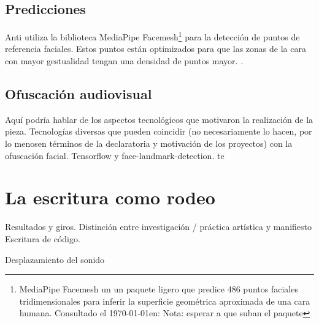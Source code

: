\subsection{Predicciones}

Anti utiliza la biblioteca MediaPipe Facemesh\footnote{MediaPipe Facemesh un un paquete ligero que predice 486 puntos faciales tridimensionales para inferir la superficie geométrica aproximada de una cara humana. Consultado el \today en: Nota: esperar a que suban el paquete} para la detección de puntos de referencia faciales. Estos puntos están optimizados para que las zonas de la cara con mayor gestualidad tengan una densidad de puntos mayor. \citep{kartynnik2019realtime}.

\subsection{Ofuscación audiovisual}

Aquí podría hablar de los aspectos tecnológicos que motivaron la realización de la pieza. Tecnologías diversas que pueden coincidir (no necesariamente lo hacen, por lo menosen términos de la declaratoria y motivación de los proyectos) con la ofuscación facial. Tensorflow y face-landmark-detection. 
te
\section{La escritura como rodeo} %

Resultados y giros. 
Distinción entre investigación / práctica artística y manifiesto 
Escritura de código. 


Desplazamiento del sonido 


